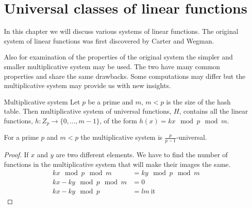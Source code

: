 \chapter {Universal classes of linear functions}

In this chapter we will discuss various systems of linear functions. The original system of linear functions was first discovered by Carter and Wegman. 

Also for examination of the properties of the original system the simpler and smaller multiplicative system may be used. The two have many common properties and share the same drawbacks. Some computations may differ but the multiplicative system may provide us with new insights.

\begin{definition}{Multiplicative system}
Let $p$ be a prime and $m$, $m < p$ is the size of the hash table. Then multiplicative system of universal functions, $H$, contains all the linear functions, $h:Z_p \rightarrow \lbrace 0, \dots, m - 1\rbrace$, of the form $h(x) = kx \mod p \mod m$. 
\end{definition}

\begin{theorem}
For a prime $p$ and $m < p$ the multiplicative system is $\frac{p}{p - 1}$-universal.
\end{theorem}
\begin{proof}
If $x$ and $y$ are two different elements. We have to find the number of functions in the multiplicative system that will make their images the same.
\begin{displaymath}
\begin{split}
kx \mod p \mod m & = ky \mod p \mod m \\
kx - ky \mod p \mod m & = 0 \\
kx - ky \mod p & = l m \ \text{it}
\end{split}
\end{displaymath}
\end{proof}



